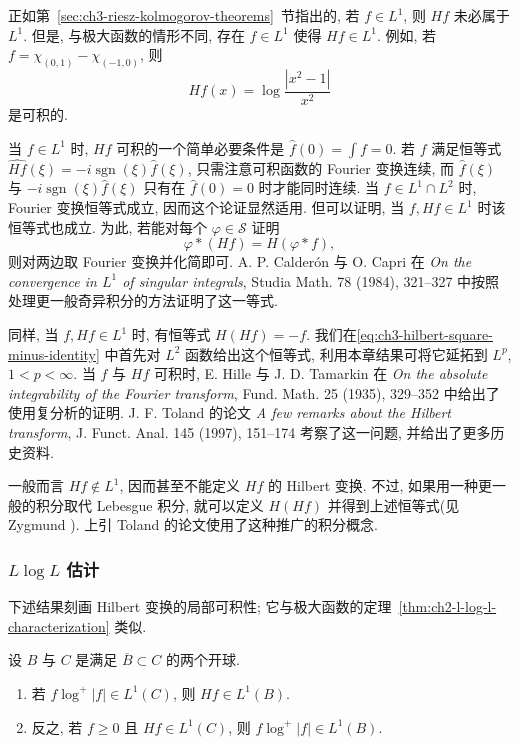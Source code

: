 正如第~\ref{sec:ch3-riesz-kolmogorov-theorems}~节指出的, 若 $f\in L^1$, 则 $Hf$ 未必属于 $L^1$. 但是, 与极大函数的情形不同, 存在 $f\in L^1$ 使得 $Hf\in L^1$. 例如, 若 $f=\chi_{(0,1)}-\chi_{(-1,0)}$, 则
\[
 Hf(x)=\log\frac{|x^2-1|}{x^2}
\]
是可积的.

当 $f\in L^1$ 时, $Hf$ 可积的一个简单必要条件是 $\widehat f(0)=\int f=0$. 若 $f$ 满足恒等式 $\widehat{Hf}(\xi)=-i\operatorname{sgn}(\xi)\widehat f(\xi)$, 只需注意可积函数的 Fourier 变换连续, 而 $\widehat f(\xi)$ 与 $-i\operatorname{sgn}(\xi)\widehat f(\xi)$ 只有在 $\widehat f(0)=0$ 时才能同时连续. 当 $f\in L^1\cap L^2$ 时, Fourier 变换恒等式成立, 因而这个论证显然适用. 但可以证明, 当 $f,Hf\in L^1$ 时该恒等式也成立. 为此, 若能对每个 $\varphi\in\mathcal S$ 证明
\[
 \varphi*(Hf)=H(\varphi*f),
\]
则对两边取 Fourier 变换并化简即可. A. P. Calderón 与 O. Capri 在 \emph{On the convergence in $L^1$ of singular integrals}, Studia Math. 78 (1984), 321--327 中按照处理更一般奇异积分的方法证明了这一等式.

同样, 当 $f,Hf\in L^1$ 时, 有恒等式 $H(Hf)=-f$. 我们在\eqref{eq:ch3-hilbert-square-minus-identity} 中首先对 $L^2$ 函数给出这个恒等式, 利用本章结果可将它延拓到 $L^p$, $1<p<\infty$. 当 $f$ 与 $Hf$ 可积时, E. Hille 与 J. D. Tamarkin 在 \emph{On the absolute integrability of the Fourier transform}, Fund. Math. 25 (1935), 329--352 中给出了使用复分析的证明. J. F. Toland 的论文 \emph{A few remarks about the Hilbert transform}, J. Funct. Anal. 145 (1997), 151--174 考察了这一问题, 并给出了更多历史资料.

一般而言 $Hf\notin L^1$, 因而甚至不能定义 $Hf$ 的 Hilbert 变换. 不过, 如果用一种更一般的积分取代 Lebesgue 积分, 就可以定义 $H(Hf)$ 并得到上述恒等式(见 Zygmund ). 上引 Toland 的论文使用了这种推广的积分概念.

\hypertarget{chapter-03-page-078}{}
\subsubsection{$L\log L$ 估计}
\label{subsec:ch3-l-log-l-estimates}

下述结果刻画 Hilbert 变换的局部可积性; 它与极大函数的定理~\ref{thm:ch2-l-log-l-characterization} 类似.

\begin{Theorem}
\label{thm:ch3-l-log-l-characterization}
设 $B$ 与 $C$ 是满足 $\overline B\subset C$ 的两个开球.

\begin{enumerate}
\item 若 $f\log^+|f|\in L^1(C)$, 则 $Hf\in L^1(B)$.
\item 反之, 若 $f\ge0$ 且 $Hf\in L^1(C)$, 则 $f\log^+|f|\in L^1(B)$.
\end{enumerate}
\end{Theorem}


